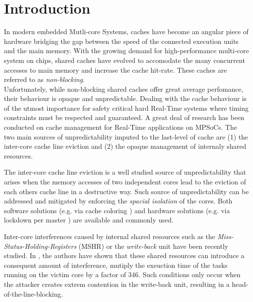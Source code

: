 \section{Introduction}
    In modern embedded Mutli-core Systems, caches have become an angular piece of hardware bridging the gap between the speed of the connected execution units and the main memory. With the growing demand for high-performance multi-core system on chips, shared caches have evolved to accomodate the many concurrent accesses to main memory and increase the cache hit-rate. These caches are referred to as \emph{non-blocking}.\\

    Unfortunately, while non-blocking shared caches offer great average perfomance, their behaviour is opaque and unpredictable. Dealing with the cache behaviour is of the utmost importance for safety critical hard Real-Time systems where timing constraints must be respected and guaranteed. A great deal of research has been conducted on cache management for Real-Time applications on MPSoCs. The two main sources of unpredictability imputed to the last-level of cache are (1) the inter-core cache line eviction and (2) the opaque management of internaly shared resources.

    The inter-core cache line eviction is a well studied source of unpredictability that arises when the memory accesses of two independent cores lead to the eviction of each others cache line in a destructive way. Such source of unpredictability can be addressed and mitigated by enforcing the \emph{spacial isolation} of the cores. Both software solutions (e.g. via cache coloring \cite{}) and hardware solutions (e.g. via lockdown per master \cite{Giovani_cahe_partitioning_survey}) are available and commonly used.

    Inter-core interferences caused by internal shared resources such as the \emph{Miss-Status-Holding-Registers} (MSHR) or the \emph{write-back} unit  have been recently studied. In \cite{Heechul_taming_non_blocking_caches}\cite{Heechul_DDOS_attacks_on_shared_cache}, the authors have shown that these shared resources can introduce a consequent amount of interference, mutiply the exeuction time of the tasks running on the victim core by a factor of 346. Such conditions only occur when the attacker creates extrem contention in the write-back unit, resulting in a head-of-the-line-blocking.\\

